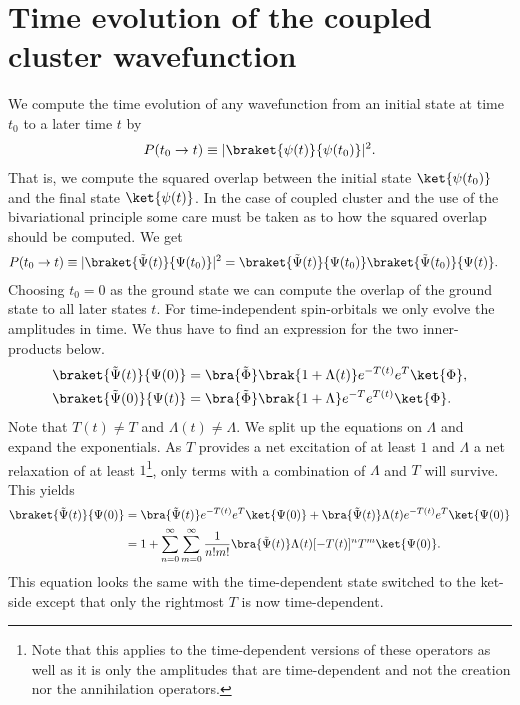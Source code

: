 \chapter{Time evolution of the coupled cluster wavefunction}
    We compute the time evolution of any wavefunction from an initial state at
    time $t_0$ to a later time $t$ by
    \begin{align}
        P(t_0 \to t)
        \equiv |\braket{\psi(t)}{\psi(t_0)}|^2.
    \end{align}
    That is, we compute the squared overlap between the initial state
    $\ket{\psi(t_0)}$ and the final state $\ket{\psi(t)}$. In the case of
    coupled cluster and the use of the bivariational principle some care must be
    taken as to how the squared overlap should be computed. We get
    \begin{align}
        P(t_0 \to t)
        &\equiv |\braket{\tilde{\Psi}(t)}{\Psi(t_0)}|^2
        = \braket{\tilde{\Psi}(t)}{\Psi(t_0)}
        \braket{\tilde{\Psi}(t_0)}{\Psi(t)}.
    \end{align}
    Choosing $t_0 = 0$ as the ground state we can compute the overlap of the
    ground state to all later states $t$. For time-independent spin-orbitals we
    only evolve the amplitudes in time. We thus have to find an expression for
    the two inner-products below.
    \begin{align}
        \braket{\tilde{\Psi}(t)}{\Psi(0)}
        &=
        \bra{\tilde{\Phi}}\brak{1 + \Lambda(t)}e^{-T(t)}
        e^{T}\ket{\Phi},
        \\
        \braket{\tilde{\Psi}(0)}{\Psi(t)}
        &=
        \bra{\tilde{\Phi}}\brak{1 + \Lambda}e^{-T}
        e^{T(t)}\ket{\Phi}.
    \end{align}
    Note that $T(t) \neq T$ and $\Lambda(t) \neq \Lambda$.  We split up the
    equations on $\Lambda$ and expand the exponentials. As $T$ provides a net
    excitation of at least $1$ and $\Lambda$ a net relaxation of at least
    $1$\footnote{Note that this applies to the time-dependent versions of these
    operators as well as it is only the amplitudes that are time-dependent and
    not the creation nor the annihilation operators.}, only terms with a
    combination of $\Lambda$ and $T$ will survive. This yields
    \begin{align}
        \braket{\tilde{\Psi}(t)}{\Psi(0)}
        &=
        \bra{\tilde{\Psi}(t)}e^{-T(t)}e^T\ket{\Psi(0)}
        +
        \bra{\tilde{\Psi}(t)}\Lambda(t)e^{-T(t)}e^T\ket{\Psi(0)}
        \\
        &=
        1
        + \sum_{n = 0}^{\infty}\sum_{m = 0}^{\infty}
        \frac{1}{n!m!}
        \bra{\tilde{\Psi}(t)}\Lambda(t)[-T(t)]^nT^m\ket{\Psi(0)}.
    \end{align}
    This equation looks the same with the time-dependent state switched to the
    ket-side except that only the rightmost $T$ is now time-dependent.

